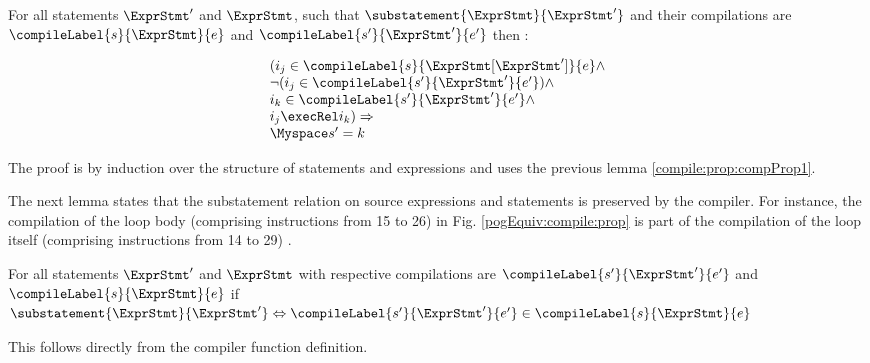 \begin{compProp2}\label{compile:prop:compProp2}
 For all  statements $\ExprStmt'$  and $\ExprStmt$, such that $\substatement{\ExprStmt }{\ExprStmt'} $
and their  compilations  are $\compileLabel{s}{\ExprStmt}{e}$ and  $\compileLabel{s'}{\ExprStmt'}{e'}$  then :




$$\begin{array}{l} %
                        (  i_j \in \compileLabel{s}{\ExprStmt[\ExprStmt']}{e} \wedge\\
		        \neg (i_j \in \compileLabel{s'}{\ExprStmt'}{e'} )   \wedge \\
		        i_k \in \compileLabel{s'}{\ExprStmt'}{e'}  \wedge \\
		        
		       i_j \execRel i_k )  \Rightarrow \\ 
		       \Myspace  s' = k 


  \end{array}$$ 

\end{compProp2}
The proof is by induction over the structure of statements and expressions  and uses the previous lemma \ref{compile:prop:compProp1}.


 
The next lemma  states that the substatement relation on source expressions and statements is preserved
by the compiler. For instance, the compilation of the loop body (comprising instructions from 15 to 26) in Fig. \ref{pogEquiv:compile:prop}  
is part of the compilation of the loop itself (comprising instructions from 14 to 29) .

\begin{compProp11}\label{compile:prop:compPropSubstmt}
For all statements $\ExprStmt'$ and $\ExprStmt $ with
respective compilations are $\compileLabel{s'}{\ExprStmt'}{e'}$ and  $\compileLabel{s}{\ExprStmt}{e}$ 
if 
  $  \substatement{\ExprStmt }{\ExprStmt'} \Leftrightarrow \compileLabel{s'}{\ExprStmt'}{e'} \in  \compileLabel{s}{\ExprStmt}{e} $ 
\end{compProp11}
This follows directly from the compiler function definition.

